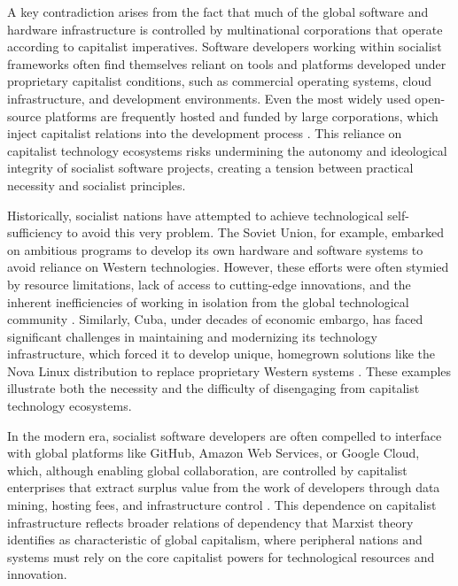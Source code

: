 \begin{refsection}
A key contradiction arises from the fact that much of the global software and hardware infrastructure is controlled by multinational corporations that operate according to capitalist imperatives. Software developers working within socialist frameworks often find themselves reliant on tools and platforms developed under proprietary capitalist conditions, such as commercial operating systems, cloud infrastructure, and development environments. Even the most widely used open-source platforms are frequently hosted and funded by large corporations, which inject capitalist relations into the development process \cite[pp.~53-56]{stallman}. This reliance on capitalist technology ecosystems risks undermining the autonomy and ideological integrity of socialist software projects, creating a tension between practical necessity and socialist principles.

Historically, socialist nations have attempted to achieve technological self-sufficiency to avoid this very problem. The Soviet Union, for example, embarked on ambitious programs to develop its own hardware and software systems to avoid reliance on Western technologies. However, these efforts were often stymied by resource limitations, lack of access to cutting-edge innovations, and the inherent inefficiencies of working in isolation from the global technological community \cite[pp.~191-194]{nove}. Similarly, Cuba, under decades of economic embargo, has faced significant challenges in maintaining and modernizing its technology infrastructure, which forced it to develop unique, homegrown solutions like the Nova Linux distribution to replace proprietary Western systems \cite[pp.~70-73]{ernesto}. These examples illustrate both the necessity and the difficulty of disengaging from capitalist technology ecosystems.

In the modern era, socialist software developers are often compelled to interface with global platforms like GitHub, Amazon Web Services, or Google Cloud, which, although enabling global collaboration, are controlled by capitalist enterprises that extract surplus value from the work of developers through data mining, hosting fees, and infrastructure control \cite[pp.~110-113]{mueller}. This dependence on capitalist infrastructure reflects broader relations of dependency that Marxist theory identifies as characteristic of global capitalism, where peripheral nations and systems must rely on the core capitalist powers for technological resources and innovation.


\end{refsection}

